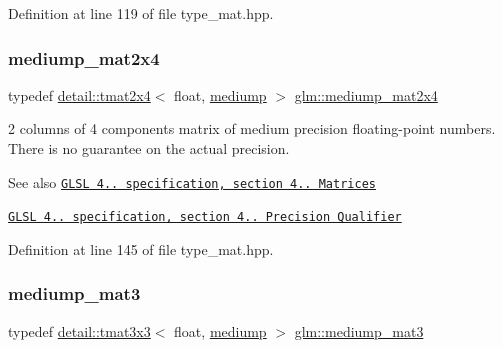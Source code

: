 Definition at line 119 of file type\+\_\+mat.\+hpp.

\mbox{\label{group__core__precision_gae90cf4be1ded03a3a5b7b42045da253c}} 
\subsubsection{\texorpdfstring{mediump\+\_\+mat2x4}{mediump\_mat2x4}}
{\footnotesize\ttfamily typedef \hyperlink{structglm_1_1detail_1_1tmat2x4}{detail\+::tmat2x4}$<$ float, \hyperlink{namespaceglm_a0f04f086094c747d227af4425893f545a6416f3ea0c9025fb21ed50c4d6620482}{mediump} $>$ \hyperlink{group__core__precision_gae90cf4be1ded03a3a5b7b42045da253c}{glm\+::mediump\+\_\+mat2x4}}

2 columns of 4 components matrix of medium precision floating-\/point numbers. There is no guarantee on the actual precision.

\begin{DoxySeeAlso}{See also}
\href{http://www.opengl.org/registry/doc/GLSLangSpec.4.20.8.pdf}{\tt G\+L\+SL 4.. specification, section 4.. Matrices} 

\href{http://www.opengl.org/registry/doc/GLSLangSpec.4.20.8.pdf}{\tt G\+L\+SL 4.. specification, section 4.. Precision Qualifier} 
\end{DoxySeeAlso}


Definition at line 145 of file type\+\_\+mat.\+hpp.

\mbox{\label{group__core__precision_gacf45e22f1fb2703b181995676963a1f9}} 
\subsubsection{\texorpdfstring{mediump\+\_\+mat3}{mediump\_mat3}}
{\footnotesize\ttfamily typedef \hyperlink{structglm_1_1detail_1_1tmat3x3}{detail\+::tmat3x3}$<$ float, \hyperlink{namespaceglm_a0f04f086094c747d227af4425893f545a6416f3ea0c9025fb21ed50c4d6620482}{mediump} $>$ \hyperlink{group__core__precision_gacf45e22f1fb2703b181995676963a1f9}{glm\+::mediump\+\_\+mat3}}

